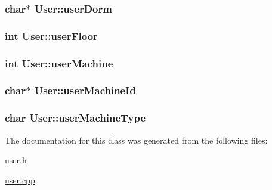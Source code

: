 \subsubsection[{user\+Dorm}]{\setlength{\rightskip}{0pt plus 5cm}char$\ast$ User\+::user\+Dorm\hspace{0.3cm}{\ttfamily [private]}}\label{classUser_ae0517de4807d5f9a449e8a4c4341f4c9}
\hypertarget{classUser_a0c86cd357c87600cf0f6ebbc066785c2}{}
\subsubsection[{user\+Floor}]{\setlength{\rightskip}{0pt plus 5cm}int User\+::user\+Floor\hspace{0.3cm}{\ttfamily [private]}}\label{classUser_a0c86cd357c87600cf0f6ebbc066785c2}
\hypertarget{classUser_aea80da016298be436439c1998c603f8d}{}
\subsubsection[{user\+Machine}]{\setlength{\rightskip}{0pt plus 5cm}int User\+::user\+Machine\hspace{0.3cm}{\ttfamily [private]}}\label{classUser_aea80da016298be436439c1998c603f8d}
\hypertarget{classUser_a38faf399c2812eb80dafc6975843ae08}{}
\subsubsection[{user\+Machine\+Id}]{\setlength{\rightskip}{0pt plus 5cm}char$\ast$ User\+::user\+Machine\+Id\hspace{0.3cm}{\ttfamily [private]}}\label{classUser_a38faf399c2812eb80dafc6975843ae08}
\hypertarget{classUser_af019bb7663447d96e7c4f8b8920b8eb1}{}
\subsubsection[{user\+Machine\+Type}]{\setlength{\rightskip}{0pt plus 5cm}char User\+::user\+Machine\+Type\hspace{0.3cm}{\ttfamily [private]}}\label{classUser_af019bb7663447d96e7c4f8b8920b8eb1}


The documentation for this class was generated from the following files\+:\begin{DoxyCompactItemize}
\item 
\hyperlink{user_8h}{user.\+h}\item 
\hyperlink{user_8cpp}{user.\+cpp}\end{DoxyCompactItemize}
